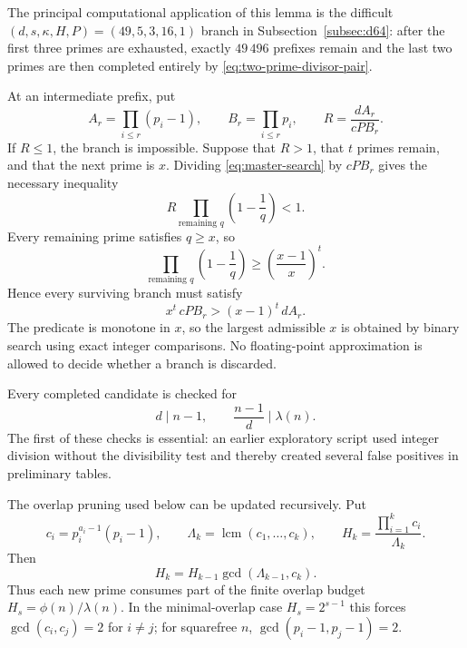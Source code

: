 \documentclass[11pt]{article}
\begin{document}
The principal computational application of this lemma is the difficult
$(d,s,\kappa,H,P)=(49,5,3,16,1)$ branch in
Subsection~\ref{subsec:d64}: after the first three primes are exhausted,
exactly $49\,496$ prefixes remain and the last two primes are then completed
entirely by \eqref{eq:two-prime-divisor-pair}.

At an intermediate prefix, put
\[
A_r=\prod_{i\le r}(p_i-1),
\qquad
B_r=\prod_{i\le r}p_i,
\qquad
R=\frac{dA_r}{cPB_r}.
\]
If $R\le1$, the branch is impossible.  Suppose that $R>1$, that $t$
primes remain, and that the next prime is $x$.  Dividing
\eqref{eq:master-search} by $cPB_r$ gives the necessary inequality
\[
R\prod_{\text{remaining }q}\left(1-\frac1q\right)<1.
\]
Every remaining prime satisfies $q\ge x$, so
\[
\prod_{\text{remaining }q}\left(1-\frac1q\right)
\ge
\left(\frac{x-1}{x}\right)^t.
\]
Hence every surviving branch must satisfy
\begin{equation}
\boxed{
x^t\,cPB_r
>
(x-1)^t\,dA_r.
}
\label{eq:exactbound}
\end{equation}
The predicate is monotone in $x$, so the largest admissible $x$ is obtained
by binary search using exact integer comparisons.  No floating-point
approximation is allowed to decide whether a branch is discarded.

Every completed candidate is checked for
\[
d\mid n-1,
\qquad
\frac{n-1}{d}\mid\lambda(n).
\]
The first of these checks is essential: an earlier exploratory script
used integer division without the divisibility test and thereby created
several false positives in preliminary tables.

The overlap pruning used below can be updated recursively.  Put
\[
c_i=p_i^{a_i-1}(p_i-1),
\qquad
\Lambda_k=\operatorname{lcm}(c_1,\ldots,c_k),
\qquad
H_k=\frac{\prod_{i=1}^k c_i}{\Lambda_k}.
\]
Then
\begin{equation}
H_k=H_{k-1}\gcd(\Lambda_{k-1},c_k).
\label{eq:overlap}
\end{equation}
Thus each new prime consumes part of the finite overlap budget
$H_s=\phi(n)/\lambda(n)$.  In the minimal-overlap case $H_s=2^{s-1}$ this
forces $\gcd(c_i,c_j)=2$ for $i\ne j$; for squarefree $n$,
$\gcd(p_i-1,p_j-1)=2$.
\end{document}
